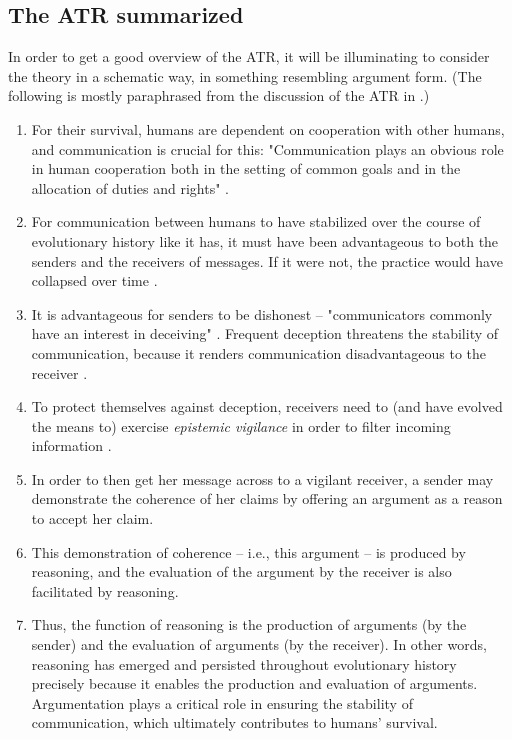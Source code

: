 \subsection{The ATR summarized}

In order to get a good overview of the ATR, it will be illuminating to consider the theory in a schematic way, in something resembling argument form. (The following is mostly paraphrased from the discussion of the ATR in \citet[p.~60]{MS11}.)

\begin{enumerate}[label=(\arabic*)]
    \item For their survival, humans are dependent on cooperation with other humans, and communication is crucial for this: "Communication plays an obvious role in human cooperation both in the setting of common goals and in the allocation of duties and rights" \citep[p.~60]{MS11}.
    \item For communication between humans to have stabilized over the course of evolutionary history like it has, it must have been advantageous to both the senders and the receivers of messages. If it were not, the practice would have collapsed over time \citep{Sperber01}.
    \item It is advantageous for senders to be dishonest -- "communicators commonly have an interest in deceiving" \citep[p.~160]{MS09}. Frequent deception threatens the stability of communication, because it renders communication disadvantageous to the receiver \citep{Sperber01}.
    \item To protect themselves against deception, receivers need to (and have evolved the means to) exercise \emph{epistemic vigilance} in order to filter incoming information \citep{Sperber10}.
    \item In order to then get her message across to a vigilant receiver, a sender may demonstrate the coherence of her claims by offering an argument as a reason to accept her claim.
    \item This demonstration of coherence -- i.e., this argument -- is produced by reasoning, and the evaluation of the argument by the receiver is also facilitated by reasoning.
    \item Thus, the function of reasoning is the production of arguments (by the sender) and the evaluation of arguments (by the receiver). In other words, reasoning has emerged and persisted throughout evolutionary history precisely because it enables the production and evaluation of arguments. Argumentation plays a critical role in ensuring the stability of communication, which ultimately contributes to humans' survival.
\end{enumerate}

